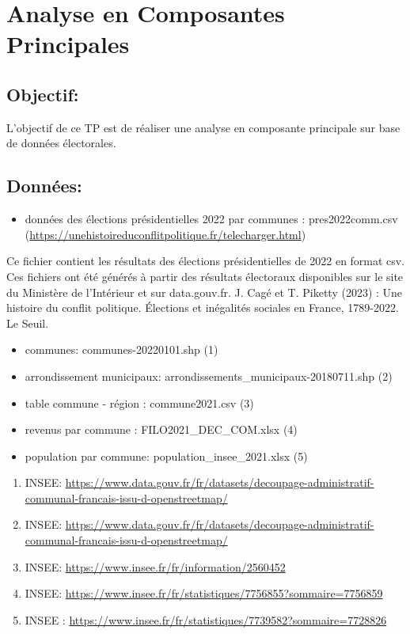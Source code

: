 \documentclass[
]{book}
\providecommand{\tightlist}{%
  \setlength{\itemsep}{0pt}\setlength{\parskip}{0pt}}
\begin{document}
\hypertarget{analyse-en-composantes-principales}{%
\chapter{Analyse en Composantes Principales}\label{analyse-en-composantes-principales}}

\hypertarget{objectif}{%
\section{Objectif:}\label{objectif}}

L'objectif de ce TP est de réaliser une analyse en composante principale sur base de données électorales.

\hypertarget{donnuxe9es}{%
\section{Données:}\label{donnuxe9es}}

\begin{itemize}
\tightlist
\item
  données des élections présidentielles 2022 par communes : pres2022comm.csv (\url{https://unehistoireduconflitpolitique.fr/telecharger.html})
\end{itemize}

Ce fichier contient les résultats des élections présidentielles de 2022 en format csv. Ces fichiers ont été générés à partir des résultats électoraux disponibles sur le site du Ministère de l'Intérieur et sur data.gouv.fr. J. Cagé et T. Piketty (2023) : Une histoire du conflit politique. Élections et inégalités sociales en France, 1789-2022. Le Seuil.

\begin{itemize}
\item
  communes: communes-20220101.shp (1)
\item
  arrondissement municipaux: arrondissements\_municipaux-20180711.shp (2)
\item
  table commune - région : commune2021.csv (3)
\item
  revenus par commune : FILO2021\_DEC\_COM.xlsx (4)
\item
  population par commune: population\_insee\_2021.xlsx (5)
\end{itemize}

\begin{enumerate}
\def\labelenumi{(\arabic{enumi})}
\tightlist
\item
  INSEE: \url{https://www.data.gouv.fr/fr/datasets/decoupage-administratif-communal-francais-issu-d-openstreetmap/}
\item
  INSEE: \url{https://www.data.gouv.fr/fr/datasets/decoupage-administratif-communal-francais-issu-d-openstreetmap/}
\item
  INSEE: \url{https://www.insee.fr/fr/information/2560452}
\item
  INSEE: \url{https://www.insee.fr/fr/statistiques/7756855?sommaire=7756859}
\item
  INSEE : \url{https://www.insee.fr/fr/statistiques/7739582?sommaire=7728826}
\end{enumerate}
\end{document}
